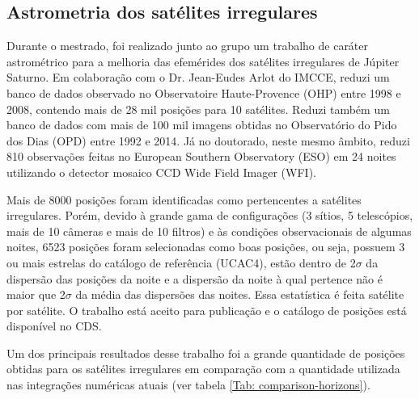 \documentclass[12pt,a4paper]{monografia}
\begin{document}
\subsection{Astrometria dos sat\'elites irregulares}
\label{Subsec: Irr-astrometria}

\indent \indent Durante o mestrado, foi realizado junto ao grupo um trabalho de caráter astrométrico para a melhoria das efemérides dos satélites irregulares de Júpiter Saturno. Em colaboração com o Dr. Jean-Eudes Arlot do IMCCE, reduzi um banco de dados observado no Observatoire Haute-Provence (OHP) entre 1998 e 2008, contendo mais de 28 mil posições para 10 satélites. Reduzi também um banco de dados com mais de 100 mil imagens obtidas no Observatório do Pido dos Dias (OPD) entre 1992 e 2014. Já no doutorado, neste mesmo âmbito, reduzi 810 observações feitas no European Southern Observatory (ESO) em 24 noites utilizando o detector mosaico CCD Wide Field Imager (WFI).

Mais de 8000 posições foram identificadas como pertencentes a satélites irregulares. Porém, devido à grande gama de configurações (3 sítios, 5 telescópios, mais de 10 câmeras e mais de 10 filtros) e às condições observacionais de algumas noites, 6523 posições foram selecionadas como boas posições, ou seja, possuem 3 ou mais estrelas do catálogo de referência (UCAC4), estão dentro de 2$\sigma$ da dispersão das posições da noite e a dispersão da noite à qual pertence não é maior que 2$\sigma$ da média das dispersões das noites. Essa estatística é feita satélite por satélite. O trabalho está aceito para publicação \citep{GomesJunior2015-Irregular} e o catálogo de posições está disponível no CDS.

Um dos principais resultados desse trabalho foi a grande quantidade de posições obtidas para os satélites irregulares em comparação com a quantidade utilizada nas integrações numéricas atuais (ver tabela \ref{Tab: comparison-horizons}).
\end{document}
